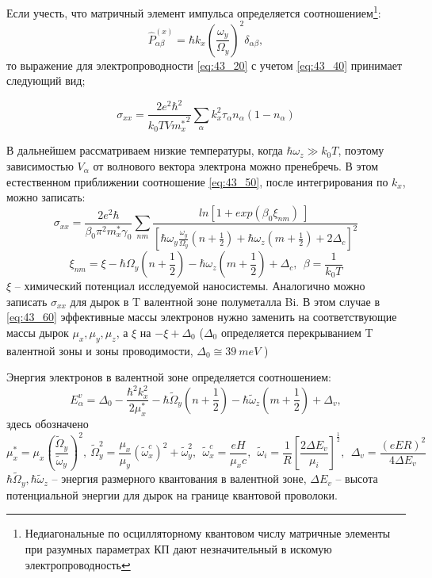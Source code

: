 Если учесть, что матричный элемент импульса определяется соотношением\footnote{Недиагональные по осцилляторному квантовом числу матричные элементы при разумных параметрах КП дают незначительный в искомую электропроводность}:
\[
{\hat{P}}^{\left(x\right)}_{\alpha \beta }=\hbar k_x{\left(\frac{{\omega }_y}{{\Omega }_y}\right)}^2{\delta }_{\alpha \beta },
\] 
то выражение для электропроводности \eqref{eq:43_20} с учетом \eqref{eq:43_40} принимает следующий вид;

\begin{equation} \label{eq:43_50} 
{\sigma }_{xx}=\frac{2e^2{\hbar }^2}{k_0TV{m^*_x}^2}\sum_{\alpha }{k^2_x{\tau }_{\alpha }n_{\alpha }\left(1-n_{\alpha }\right)}
\end{equation}

В дальнейшем рассматриваем низкие температуры, когда $\hbar {\omega }_z\gg k_0T$, поэтому зависимостью $V_{\alpha }$ от волнового вектора электрона можно пренебречь. В этом естественном приближении соотношение \eqref{eq:43_50}, после интегрирования по $k_x$, можно записать:
\begin{equation} \label{eq:43_60}
{\sigma }_{xx}=\frac{2e^2\hbar }{{\beta }_0{\pi }^2m^*_x{\gamma }_0}\sum_{nm}{\frac{{ln \left[1+{exp \left({\beta }_0{\xi }_{nm}\right)\ }\right]\ }}{{\left[\hbar {\omega }_y\frac{{\omega }_y}{{\Omega }_y}\left(n+\frac{1}{2}\right)+\hbar {\omega }_z\left(m+\frac{1}{2}\right)+2{\Delta }_c\right]}^2}} 
\end{equation}
\[
{\xi }_{nm}=\xi -\hbar {\Omega }_y\left(n+\frac{1}{2}\right)-\hbar {\omega }_z\left(m+\frac{1}{2}\right)+{\Delta }_c,\ \ \beta =\frac{1}{k_0T}
\]
$\xi $ -- химический потенциал исследуемой наносистемы. Аналогично можно записать ${\sigma }_{xx}$ для дырок в T валентной зоне полуметалла Bi. В этом случае в \eqref{eq:43_60} эффективные массы электронов нужно заменить на соответствующие массы дырок ${\mu }_x,{\mu }_y,{\mu }_z$, а $\xi $  на $-\xi +{\Delta }_0$ (${\Delta }_0$ определяется перекрыванием T валентной зоны и зоны проводимости, ${\Delta }_0\cong 39\ meV$ \cite{Levin2009a}) 

Энергия электронов в валентной зоне определяется соотношением:
\[
E^v_{\alpha }={\Delta }_0-\frac{{\hbar }^2k^2_x}{2{\mu }^*_x}-\hbar {\widetilde{\Omega }}_y\left(n+\frac{1}{2}\right)-\hbar {\widetilde{\omega }}_z\left(m+\frac{1}{2}\right)+{\Delta }_v,
\] 
здесь обозначено
\[
{\mu }^*_x={\mu }_x{\left(\frac{{\widetilde{\Omega }}_y}{{\widetilde{\omega }}_y}\right)}^2,\ {\widetilde{\Omega }}^2_y=\frac{{\mu }_x}{{\mu }_y}{\left({\widetilde{\omega }}^c_x\right)}^2+{\widetilde{\omega }}^2_y,\ \ {\widetilde{\omega }}^c_x=\frac{eH}{{\mu }_xc},\ \ {\widetilde{\omega }}_i=\frac{1}{R}{\left[\frac{2\Delta E_v}{{\mu }_i}\right]}^{\frac{1}{2}},\ \ {\Delta }_v=\frac{{\left(eER\right)}^2}{4\Delta E_v}
\] 
$\hbar {\widetilde{\Omega }}_y, \hbar {\widetilde{\omega }}_z$ -- энергия размерного квантования в валентной зоне, $\Delta E_v$ -- высота потенциальной энергии для дырок на границе квантовой проволоки.

